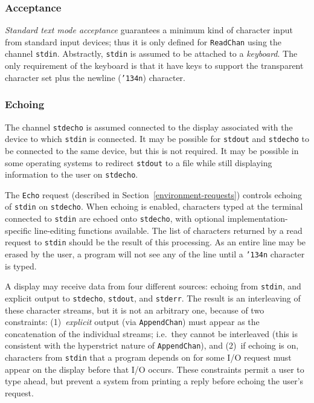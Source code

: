 \subsubsection{Acceptance}

{\em Standard text mode acceptance}
guarantees a minimum kind of character input from standard input
devices; thus it is only defined for \mbox{\tt ReadChan} using the channel
\mbox{\tt stdin}.  Abstractly, \mbox{\tt stdin} is assumed to be attached to a {\em
keyboard}.  The only requirement of the keyboard is that it have keys
to support the transparent character set plus the newline (\mbox{\tt {\char'134}n})
character.

\subsubsection{Echoing}
\label{echoing}

The channel \mbox{\tt stdecho} is assumed connected to the display associated
with the device to which \mbox{\tt stdin} is connected.  It may be possible for
\mbox{\tt stdout} and \mbox{\tt stdecho} to be connected to the same device, but this is
not required.  It may be possible in some operating systems to
redirect \mbox{\tt stdout} to a file while still displaying information to
the user on \mbox{\tt stdecho}.

The \mbox{\tt Echo} request (described in Section~\ref{environment-requests})
controls echoing of \mbox{\tt stdin} on \mbox{\tt stdecho}.  When echoing
is enabled, characters typed at the terminal connected to \mbox{\tt stdin} are
echoed onto \mbox{\tt stdecho}, with
optional implementation-specific line-editing functions available.
The list of characters returned by a read request to
\mbox{\tt stdin} should be the result of this processing.  As an
entire line may be erased by the user, a program will not see
any of the line until a \mbox{\tt {\char'134}n} character is typed.

A display may receive data from four
different sources: echoing from \mbox{\tt stdin}, and explicit output to
\mbox{\tt stdecho}, \mbox{\tt stdout}, and \mbox{\tt stderr}.  The result is an interleaving of
these character streams, but it is not an arbitrary one, because of
two constraints: (1)~{\em explicit} output (via \mbox{\tt AppendChan}) must
appear as the concatenation of the individual streams; i.e.~they
cannot be interleaved (this is consistent with the hyperstrict nature
of \mbox{\tt AppendChan}), and (2)~if echoing is on, characters from \mbox{\tt stdin}
that a program depends on for some I/O request must appear on the
display before that I/O occurs.  These constraints permit a
user to type ahead, but prevent a system from printing a reply
before echoing the user's request.

